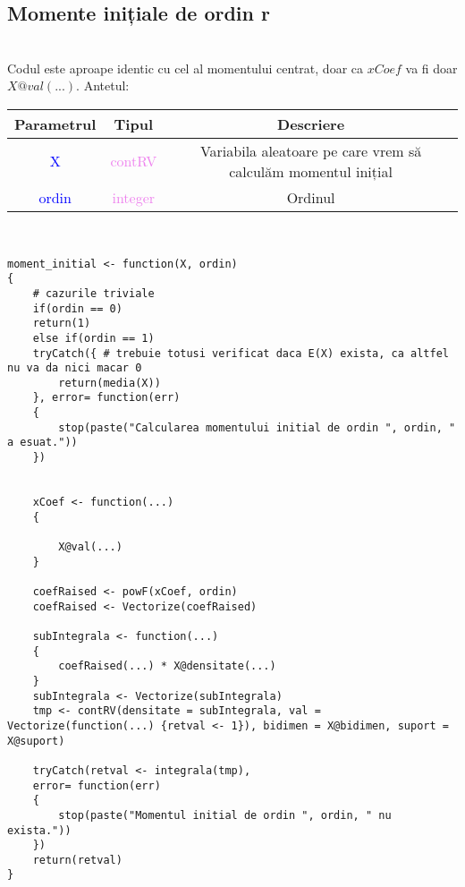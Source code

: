 \documentclass[12pt]{article}
\begin{document}
\subsection{Momente inițiale de ordin r}\hfill \\
\indent Codul este aproape identic cu cel al momentului centrat, doar ca $xCoef$ va fi doar $X@val(...)$. Antetul: 
\begin{center}
	\begin{tabular}{|| c | c | c ||}
		\hline
		Parametrul & Tipul & Descriere \\
		\hline
		\textcolor{blue}{X} & \textcolor{violet}{contRV} & Variabila aleatoare pe care vrem să calculăm momentul inițial\\
		\hline
		\textcolor{blue}{ordin} & \textcolor{violet}{integer} & Ordinul\\
		\hline
	\end{tabular}
\end{center}\hfill \\
\begin{lstlisting}
moment_initial <- function(X, ordin)
{
	# cazurile triviale
	if(ordin == 0)
	return(1)
	else if(ordin == 1)
	tryCatch({ # trebuie totusi verificat daca E(X) exista, ca altfel nu va da nici macar 0
		return(media(X))
	}, error= function(err)
	{
		stop(paste("Calcularea momentului initial de ordin ", ordin, " a esuat."))
	})
	
	
	xCoef <- function(...)
	{
		
		X@val(...)
	}
	
	coefRaised <- powF(xCoef, ordin)
	coefRaised <- Vectorize(coefRaised)
	
	subIntegrala <- function(...)
	{
		coefRaised(...) * X@densitate(...)
	}
	subIntegrala <- Vectorize(subIntegrala)
	tmp <- contRV(densitate = subIntegrala, val = Vectorize(function(...) {retval <- 1}), bidimen = X@bidimen, suport = X@suport)
	
	tryCatch(retval <- integrala(tmp),
	error= function(err)
	{
		stop(paste("Momentul initial de ordin ", ordin, " nu exista."))
	})
	return(retval)
}
\end{lstlisting}
\end{document}
